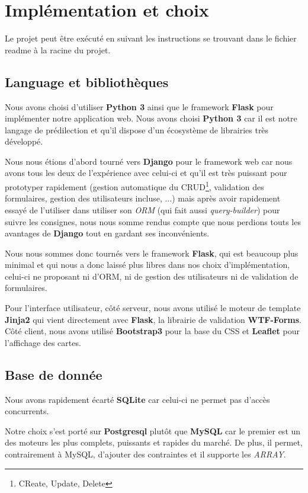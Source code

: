 \documentclass[10pt,a4paper]{article}
\begin{document}
\section{Implémentation et choix}

Le projet peut être exécuté en suivant les instructions se trouvant dans le fichier readme à la racine du projet.

\subsection{Language et bibliothèques}

Nous avons choisi d'utiliser \textbf{Python 3} ainsi que le framework \textbf{Flask} pour implémenter notre application web. Nous avons choisi \textbf{Python 3} car il est notre langage de prédilection et qu'il dispose d'un écosystème de librairies très développé.

Nous nous étions d'abord tourné vers \textbf{Django} pour le framework web car nous avons tous les deux de l'expérience avec celui-ci et qu'il est très puissant pour prototyper rapidement (gestion automatique du CRUD\footnote{CReate, Update, Delete}, validation des formulaires, gestion des utilisateurs incluse, ...) mais après avoir rapidement essayé de l'utiliser dans utiliser son \textit{ORM} (qui fait aussi \textit{query-builder}) pour suivre les consignes, nous nous somme rendus compte que nous perdions touts les avantages de \textbf{Django} tout en gardant ses inconvénients.

Nous nous sommes donc tournés vers le framework \textbf{Flask}, qui est beaucoup plus minimal et qui nous a donc laissé plus libres dans nos choix d'implémentation, celui-ci ne proposant ni d'ORM, ni de gestion des utilisateurs ni de validation de formulaires.

Pour l'interface utilisateur, côté serveur, nous avons utilisé le moteur de template \textbf{Jinja2} qui vient directement avec \textbf{Flask}, la librairie de validation \textbf{WTF-Forms}. Côté client, nous avons utilisé \textbf{Bootstrap3} pour la base du CSS et \textbf{Leaflet} pour l'affichage des cartes.

\subsection{Base de donnée}

Nous avons rapidement écarté \textbf{SQLite} car celui-ci ne permet pas d'accès concurrents.

Notre choix s'est porté sur \textbf{Postgresql} plutôt que \textbf{MySQL} car le premier est un des moteurs les plus complets, puissants et rapides du marché. De plus, il permet, contrairement à MySQL, d'ajouter des contraintes et il supporte les \textit{ARRAY}.
\end{document}
